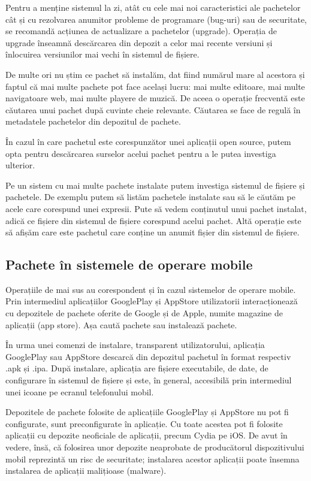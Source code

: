 Pentru a menține sistemul la zi, atât cu cele mai noi caracteristici ale pachetelor cât și cu rezolvarea anumitor probleme de programare (bug-uri) sau de securitate, se recomandă acțiunea de actualizare a pachetelor (upgrade). Operația de upgrade înseamnă descărcarea din depozit a celor mai recente versiuni și înlocuirea versiunilor mai vechi în sistemul de fișiere.

De multe ori nu știm ce pachet să instalăm, dat fiind numărul mare al acestora și faptul că mai multe pachete pot face același lucru: mai multe editoare, mai multe navigatoare web, mai multe playere de muzică. De aceea o operație frecventă este căutarea unui pachet după cuvinte cheie relevante. Căutarea se face de regulă în metadatele pachetelor din depozitul de pachete.

În cazul în care pachetul este corespunzător unei aplicații open source, putem opta pentru descărcarea surselor acelui pachet pentru a le putea investiga ulterior.

Pe un sistem cu mai multe pachete instalate putem investiga sistemul de fișiere și pachetele. De exemplu putem să listăm pachetele instalate sau să le căutăm pe acele care corespund unei expresii. Pute să vedem conținutul unui pachet instalat, adică ce fișiere din sistemul de fișiere corespund acelui pachet. Altă operație este să afișăm care este pachetul care conține un anumit fișier din sistemul de fișiere.

\subsection{Pachete în sistemele de operare mobile}
\label{sec:package:mobile}

Operațiile de mai sus au corespondent și în cazul sistemelor de operare mobile. Prin intermediul aplicațiilor GooglePlay și AppStore utilizatorii interacționează cu depozitele de pachete oferite de Google și de Apple, numite magazine de aplicații (app store). Așa caută pachete sau instalează pachete.

În urma unei comenzi de instalare, transparent utilizatorului, aplicația GooglePlay sau AppStore descarcă din depozitul pachetul în format respectiv .apk și .ipa. După instalare, aplicația are fișiere executabile, de date, de configurare în sistemul de fișiere și este, în general, accesibilă prin intermediul unei icoane pe ecranul telefonului mobil.

Depozitele de pachete folosite de aplicațiile GooglePlay și AppStore nu pot fi configurate, sunt preconfigurate în aplicație. Cu toate acestea pot fi folosite aplicații cu depozite neoficiale de aplicații, precum Cydia pe iOS. De avut în vedere, însă, că folosirea unor depozite neaprobate de producătorul dispozitivului mobil reprezintă un risc de securitate; instalarea acestor aplicații poate însemna instalarea de aplicații malițioase (malware).

